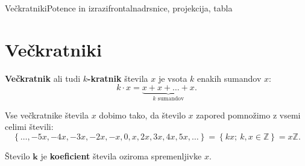 \begin{priprava}{6}{}{Večkratniki}{Potence in izrazi}{frontalna}{drsnice, projekcija, tabla}


    \section{Večkratniki}

        
            
            
    \textbf{Večkratnik} ali tudi \textbf{$k$-kratnik} števila $x$ je vsota $k$ enakih sumandov $x$:
        $${k\cdot x=\underbrace{x+x+\ldots+x}_\text{$k$ sumandov}}.$$



    Vse večkratnike števila $x$ dobimo tako, da število $x$ zapored pomnožimo z vsemi celimi števili:
    $$\left\{\ldots,-5x, -4x, -3x, -2x, -x, 0, x, 2x, 3x, 4x, 5x, \ldots\right\}=\left\{kx;\ k,x\in\mathbb{Z}\right\}=x\mathbb{Z}. $$



    Število $\mathbf{k}$ je \textbf{koeficient} števila oziroma spremenljivke $x$.


    

\end{priprava}